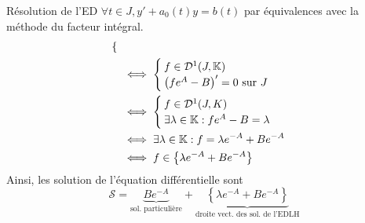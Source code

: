 \documentclass{article}
\renewenvironment{question_kholle}[2][ ]
{
	\subsection{\texorpdfstring{#2}{}}
	\notblank{#1}
	{
		\noindent #1
		\bigbreak
	}
	{}
	\begin{proof}
}
{
	\end{proof}
}
\begin{document}
\begin{question_kholle}{Résolution de l'ED  $\forall t \in J, y' + a_{0}(t)y = b(t)$ par équivalences avec la méthode du facteur intégral.}
\begin{align*}
\begin{cases}
		                                                                                                                             \end{cases}                                                                                                                          \\
		                                                                                                                      & \iff \begin{cases}
			                                                                                                                             f\in\mathcal{D}^1(J,\mathbb K) \\
			                                                                                                                             \left(f e^{A}-B\right)' = 0 \text{ sur } J
		                                                                                                                             \end{cases}                                                                                                                         \\
		                                                                                                                      & \iff \begin{cases}
			                                                                                                                             f\in\mathcal{D}^{1}(J,K) \\
			                                                                                                                             \exists \lambda\in\mathbb K: f e^{A}-B=\lambda
		                                                                                                                             \end{cases}                                                                                                                            \\
		                                                                                                                      & \iff \exists \lambda\in\mathbb K: f=\lambda e^{-A}+B e^{-A}                                                                                                                   \\
		                                                                                                                      & \iff f\in \left\{\lambda e^{-A}+B e^{-A}\right\}
	\end{align*}
	Ainsi, les solution de l’équation différentielle sont
	\[
		\mathcal{S}=\underbrace{B e^{-A}}_{\text{sol. particulière}} + \underbrace{\left\{\lambda e^{-A}+B e^{-A}\right\}}_{\text{droite vect. des sol. de l'EDLH}}
	\]
\end{question_kholle}
\end{document}

